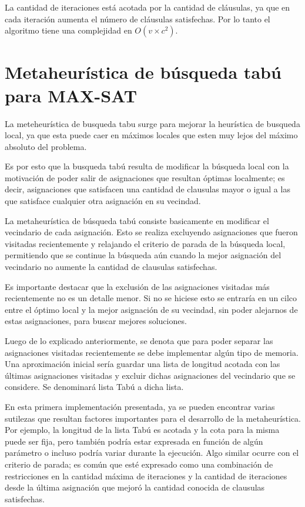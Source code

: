\documentclass[a4paper,10pt]{article}
\begin{document}
La cantidad de iteraciones está acotada por la cantidad de cláusulas, ya que en cada iteración aumenta el número de cláusulas satisfechas. Por lo tanto el algoritmo tiene una complejidad en $O\left( v \times c^2 \right)$.


\section*{Metaheur\'istica de b\'usqueda tab\'u para MAX-SAT}

La meteheur\'istica de busqueda tabu surge para mejorar la heur\'istica de busqueda local, ya que esta puede caer en m\'aximos locales que esten muy lejos del m\'aximo absoluto del problema.

Es por esto que la busqueda tab\'u resulta de modificar la b\'usqueda local con la motivaci\'on de poder salir de asignaciones que resultan \'optimas localmente; es decir, asignaciones que satisfacen una cantidad de clausulas mayor o igual a las que satisface cualquier otra asignaci\'on en su vecindad.

La metaheur\'istica de b\'usqueda tab\'u consiste basicamente en modificar el vecindario de cada asignaci\'on. Esto se realiza excluyendo asignaciones que fueron visitadas recientemente y relajando el criterio de parada de la b\'usqueda local, permitiendo que se continue la b\'usqueda a\'un cuando la mejor asignaci\'on del vecindario no aumente la cantidad de clausulas satisfechas. 

Es importante destacar que la exclusi\'on de las asignaciones visitadas m\'as recientemente no es un detalle menor. Si no se hiciese esto se entrar\'ia en un cilco entre el \'optimo local y la mejor asignaci\'on de su vecindad, sin poder alejarnos de estas asignaciones, para buscar mejores soluciones.

Luego de lo explicado anteriormente, se denota que para poder separar las asignaciones visitadas recientemente se debe implementar alg\'un tipo de memoria. Una aproximaci\'on inicial ser\'ia guardar una lista de longitud acotada con las \'ultimas asignaciones visitadas y excluir dichas asignaciones del vecindario que se considere. Se denominar\'a lista Tab\'u a dicha lista.

En esta primera implementaci\'on presentada, ya se pueden encontrar varias sutilezas que resultan factores importantes para el desarrollo de la metaheur\'istica. Por ejemplo, la longitud de la lista Tab\'u es acotada y la cota para la misma puede ser fija, pero tambi\'en podr\'ia estar expresada en funci\'on de alg\'un par\'ametro o incluso podr\'ia variar durante la ejecuci\'on. Algo similar ocurre con el criterio de parada; es com\'un que est\'e expresado como una combinaci\'on de restricciones en la cantidad m\'axima de iteraciones y la cantidad de iteraciones desde la \'ultima asignaci\'on que mejor\'o la cantidad conocida de clausulas satisfechas.
\end{document}
